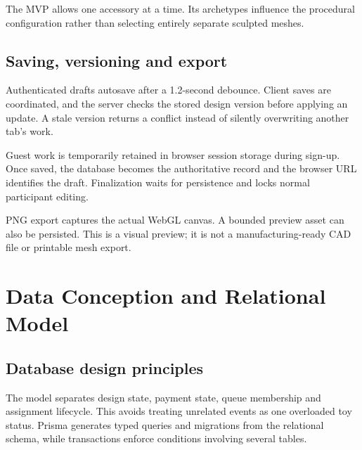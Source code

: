 \documentclass[11pt,a4paper]{article}
\begin{document}
The MVP allows one accessory at a time. Its archetypes influence the procedural configuration rather than selecting entirely separate sculpted meshes.

\subsection{Saving, versioning and export}
Authenticated drafts autosave after a 1.2-second debounce. Client saves are coordinated, and the server checks the stored design version before applying an update. A stale version returns a conflict instead of silently overwriting another tab's work.

Guest work is temporarily retained in browser session storage during sign-up. Once saved, the database becomes the authoritative record and the browser URL identifies the draft. Finalization waits for persistence and locks normal participant editing.

PNG export captures the actual WebGL canvas. A bounded preview asset can also be persisted. This is a visual preview; it is not a manufacturing-ready CAD file or printable mesh export.

\section{Data Conception and Relational Model}

\subsection{Database design principles}
The model separates design state, payment state, queue membership and assignment lifecycle. This avoids treating unrelated events as one overloaded toy status. Prisma generates typed queries and migrations from the relational schema, while transactions enforce conditions involving several tables.
\end{document}
